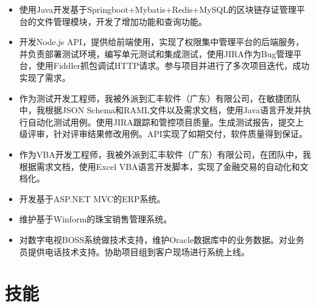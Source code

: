 \documentclass{resume}
\begin{document}
\begin{itemize}[parsep=0.5ex]
  \item 使用Java开发基于Springboot+Mybatis+Redis+MySQL的区块链存证管理平台的文件管理模块，开发了增加功能和查询功能。
  \item 开发Node.js API，提供给前端使用，实现了权限集中管理平台的后端服务，并负责部署测试环境，编写单元测试和集成测试，使用JIRA作为Bug管理平台，使用Fiddler抓包调试HTTP请求。参与项目并进行了多次项目迭代，成功实现了需求。
\end{itemize}

\begin{itemize}[parsep=0.5ex]
  \item 作为测试开发工程师，我被外派到汇丰软件（广东）有限公司，在敏捷团队中，我根据JSON Schema和RAML文件以及需求文档，使用Java语言开发并执行自动化测试用例。使用JIRA跟踪和管控项目质量。生成测试报告，提交上级评审，针对评审结果修改用例。API实现了如期交付，软件质量得到保证。
\end{itemize}

\begin{itemize}[parsep=0.5ex]
  \item 作为VBA开发工程师，我被外派到汇丰软件（广东）有限公司，在团队中，我根据需求文档，使用Excel VBA语言开发脚本，实现了金融交易的自动化和文档化。
\end{itemize}

\begin{itemize}[parsep=0.5ex]
  \item 开发基于ASP.NET MVC的ERP系统。
  \item 维护基于Winform的珠宝销售管理系统。
\end{itemize}

\begin{itemize}[parsep=0.5ex]
  \item 对数字电视BOSS系统做技术支持，维护Oracle数据库中的业务数据。对业务员提供电话技术支持。协助项目组到客户现场进行系统上线。
\end{itemize}


\section{技能}
\end{document}
